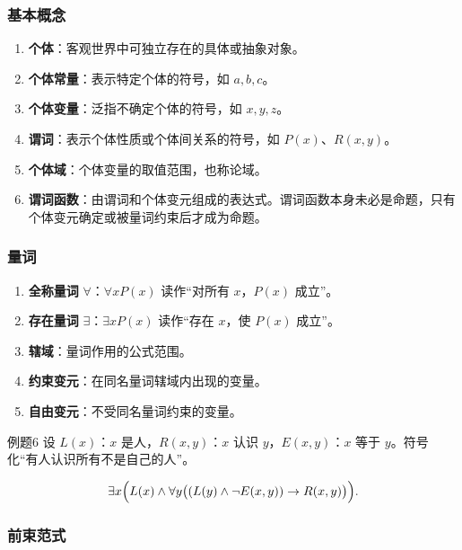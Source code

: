 \subsubsection{基本概念}

\begin{enumerate}
	\item \textbf{个体}：客观世界中可独立存在的具体或抽象对象。
	\item \textbf{个体常量}：表示特定个体的符号，如 \(a,b,c\)。
	\item \textbf{个体变量}：泛指不确定个体的符号，如 \(x,y,z\)。
	\item \textbf{谓词}：表示个体性质或个体间关系的符号，如 \(P(x)\)、\(R(x,y)\)。
	\item \textbf{个体域}：个体变量的取值范围，也称论域。
	\item \textbf{谓词函数}：由谓词和个体变元组成的表达式。谓词函数本身未必是命题，只有个体变元确定或被量词约束后才成为命题。
\end{enumerate}

\subsubsection{量词}

\begin{enumerate}
	\item \textbf{全称量词} \(\forall\)：\(\forall xP(x)\) 读作“对所有 \(x\)，\(P(x)\) 成立”。
	\item \textbf{存在量词} \(\exists\)：\(\exists xP(x)\) 读作“存在 \(x\)，使 \(P(x)\) 成立”。
	\item \textbf{辖域}：量词作用的公式范围。
	\item \textbf{约束变元}：在同名量词辖域内出现的变量。
	\item \textbf{自由变元}：不受同名量词约束的变量。
\end{enumerate}

\begin{question}{例题6}
	设 \(L(x)\)：\(x\) 是人，\(R(x,y)\)：\(x\) 认识 \(y\)，\(E(x,y)\)：\(x\) 等于 \(y\)。符号化“有人认识所有不是自己的人”。
	
	\begin{solution}
	\[
	\exists x\Bigl(L(x)\land \forall y\bigl((L(y)\land\neg E(x,y))\to R(x,y)\bigr)\Bigr).
	\]
	\end{solution}
\end{question}

\subsubsection{前束范式}

